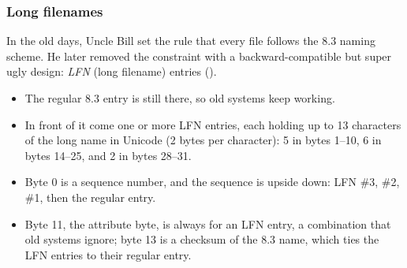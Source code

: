 \subsubsection{Long filenames}
In the old days, Uncle Bill set the rule that every file follows the 8.3 naming scheme. He later removed the constraint with a backward-compatible but super ugly design: \emph{LFN} (long filename) entries ().
\begin{itemize}
  \item The regular 8.3 entry is still there, so old systems keep working.
  \item In front of it come one or more LFN entries, each holding up to 13 characters of the long name in Unicode (2 bytes per character): 5 in bytes 1--10, 6 in bytes 14--25, and 2 in bytes 28--31.
  \item Byte 0 is a sequence number, and the sequence is upside down: LFN \#3, \#2, \#1, then the regular entry.
  \item Byte 11, the attribute byte, is always  for an LFN entry, a combination that old systems ignore; byte 13 is a checksum of the 8.3 name, which ties the LFN entries to their regular entry.
\end{itemize}

